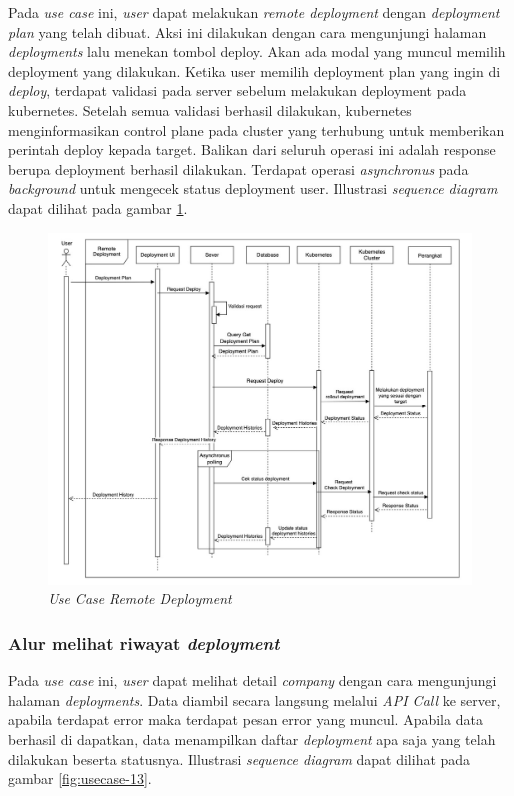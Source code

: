 Pada \textit{use case} ini, \textit{user} dapat melakukan \textit{remote deployment} dengan \textit{deployment plan} yang telah dibuat. Aksi ini dilakukan dengan cara mengunjungi halaman \textit{deployments} lalu menekan tombol deploy. Akan ada modal yang muncul memilih deployment yang dilakukan. Ketika user memilih deployment plan yang ingin di \textit{deploy}, terdapat validasi pada server sebelum melakukan deployment pada kubernetes. Setelah semua validasi berhasil dilakukan, kubernetes menginformasikan control plane pada cluster yang terhubung untuk memberikan perintah deploy kepada target. Balikan dari seluruh operasi ini adalah response berupa deployment berhasil dilakukan. Terdapat operasi \textit{asynchronus} pada \textit{background} untuk mengecek status deployment user. Illustrasi \textit{sequence diagram} dapat dilihat pada gambar \ref{fig:usecase-12}.

\begin{figure}[ht]
  \centering
  \includegraphics[width=1\textwidth]{resources/chapter-3/usecase/uc-12.jpg}
  \caption{\textit{Use Case} \textit{Remote Deployment}}
  \label{fig:usecase-12}
\end{figure}

\pagebreak

\subsubsection{Alur melihat riwayat \textit{deployment}}

Pada \textit{use case} ini, \textit{user} dapat melihat detail \textit{company} dengan cara mengunjungi halaman \textit{deployments}. Data diambil secara langsung melalui \textit{API Call} ke server, apabila terdapat error maka terdapat pesan error yang muncul. Apabila data berhasil di dapatkan, data menampilkan daftar \textit{deployment} apa saja yang telah dilakukan beserta statusnya. Illustrasi \textit{sequence diagram} dapat dilihat pada gambar \ref{fig:usecase-13}.

